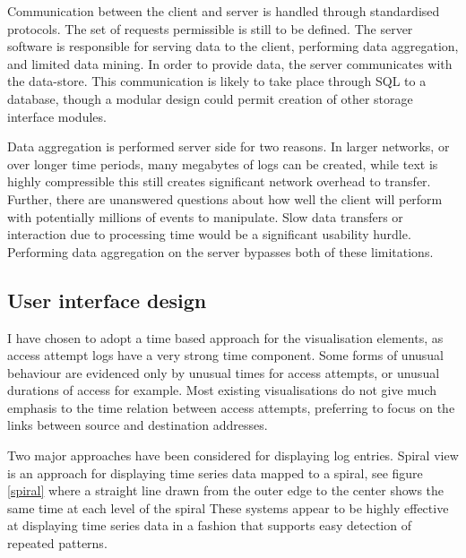 Communication between the client and server is handled through standardised protocols. The set of requests permissible is still to be defined. The server software is responsible for serving data to the client, performing data aggregation, and limited data mining. In order to provide data, the server communicates with the data-store. This communication is likely to take place through SQL to a database, though a modular design could permit creation of other storage interface modules.

Data aggregation is performed server side for two reasons. In larger networks, or over longer time periods, many megabytes of logs can be created, while text is highly compressible this still creates significant network overhead to transfer. Further, there are unanswered questions about how well the client will perform with potentially millions of events to manipulate. Slow data transfers or interaction due to processing time would be a significant usability hurdle. Performing data aggregation on the server bypasses both of these limitations. 

\subsection{User interface design}\label{screen_design} 
  
I have chosen to adopt a time based approach for the visualisation elements, as access attempt logs have a very strong time component. Some forms of unusual behaviour are evidenced only by unusual times for access attempts, or unusual durations of access for example. Most existing visualisations do not give much emphasis to the time relation between access attempts, preferring to focus on the links between source and destination addresses.

Two major approaches have been considered for displaying log entries.
Spiral view is an approach for displaying time series data mapped to a spiral, see figure \ref{spiral} where a straight line drawn from the outer edge to the center shows the same time at each level of the spiral \cite{bertini2007spiralview, chin2009visual}
These systems appear to be highly effective at displaying time series data in a fashion that supports easy detection of repeated patterns. 

